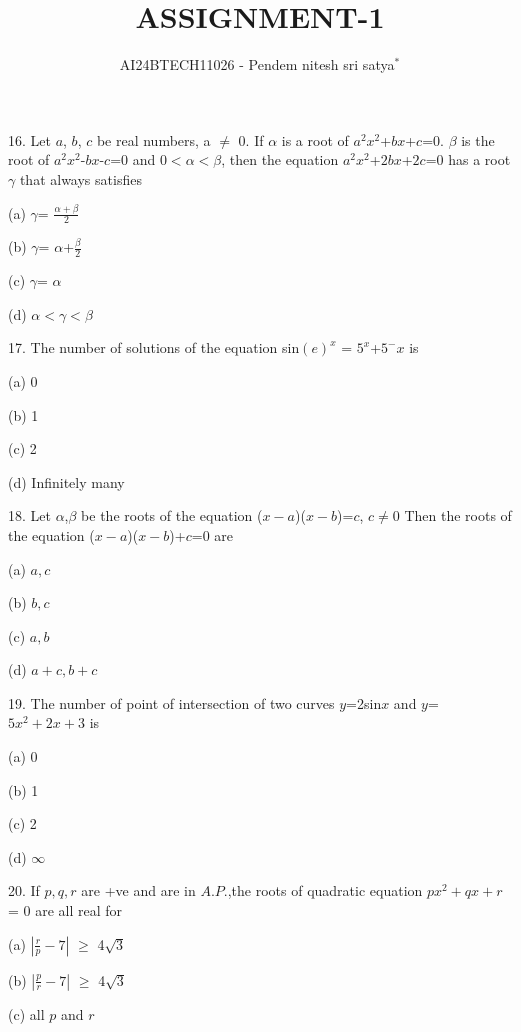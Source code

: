 \documentclass[journal,12pt,twocolumn]{IEEEtran}
\theoremstyle{remark}
\begin{document}

\vspace{3cm}

\title{ASSIGNMENT-1}
\author{AI24BTECH11026 - Pendem nitesh sri satya$^{*}$%
}
\maketitle
\newpage
\bigskip

\renewcommand{\thefigure}{\theenumi}
\renewcommand{\thetable}{\theenumi}

16.   Let $a$, $b$, $c$ be real numbers, a $\neq$ 0. If $\alpha$ is a root of $a^2x^2$+$bx$+$c$=0. $\beta$ is the root of $a^2x^2$-$bx$-$c$=0 and 0$<$$\alpha$$<$$\beta$, then the equation $a^2x^2$+$2bx$+$2c$=0 has a root $\gamma$ that always satisfies

(a) $\gamma$= $\frac{\alpha+\beta}{2}$

(b) $\gamma$=  $\alpha$+$\frac{\beta}{2}$

(c) $\gamma$= $\alpha$

(d) $\alpha$$<$$\gamma$$<$$\beta$

17.   The number of solutions of the equation sin$(e)^x$ = $5^x$+$5^-x$ is

(a) 0

(b) 1

(c) 2

(d) Infinitely many

18.    Let $\alpha$,$\beta$ be the roots of the equation ($x-a$)($x-b$)=$c$, $c \neq 0$ Then the roots of the equation ($x-a$)($x-b$)+$c$=0 are

(a) $a,c$

(b) $b,c$

(c) $a,b$

(d) $a+c,b+c$

19.    The number of point of intersection of two curves $y$=2sin$x$ and $y$=$5x^2+2x+3$ is

(a) 0

(b) 1

(c) 2

(d) $\infty$

20.    If $p,q,r$ are +ve and are in $A.P$.,the roots of quadratic equation $px^2+qx+r$ = 0 are all real for

(a) $\left|\frac{r}{p}-7\right|$ $\geq$ 4$\sqrt{3}$

(b) $\left|\frac{p}{r}-7\right|$ $\geq$ 4$\sqrt{3}$

(c) all $p$ and $r$
\end{document}
